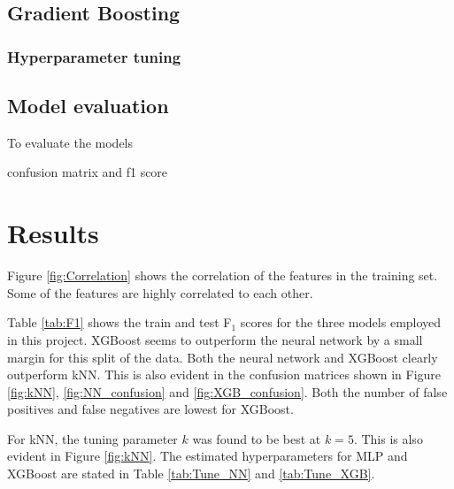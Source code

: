 \documentclass[a4paper, 11pt, twocolumn]{article}
\begin{document}
\subsection{Gradient Boosting}
\subsubsection{Hyperparameter tuning}


\subsection{Model evaluation}
To evaluate the models 

confusion matrix and f1 score

\section{Results}

Figure \ref{fig:Correlation} shows the correlation of the features in the training set. Some of the features are highly correlated to each other.

Table \ref{tab:F1} shows the train and test F$_1$ 
scores for the three models employed in this project. 
XGBoost seems to outperform the neural network by a
 small margin for this split of the data. Both the
  neural network and XGBoost clearly outperform kNN.
  This is also evident in the confusion matrices shown
  in Figure \ref{fig:kNN}, \ref{fig:NN_confusion} and
  \ref{fig:XGB_confusion}. Both the number of false
  positives and false negatives are lowest for XGBoost.
  
For kNN, the tuning parameter $k$ was found to be best
at $k=5$. This is also evident in Figure
\ref{fig:kNN}. The estimated hyperparameters for MLP and
  XGBoost are stated in Table \ref{tab:Tune_NN} and
   \ref{tab:Tune_XGB}.

\begin{table}
\centering
{}
\caption{Estimated hyperparameters for the neural network model employed in this project.}
\label{tab:Tune_NN}
\end{table}

\begin{table}
\centering
{}
\caption{Estimated hyperparameters for the XGB model employed in this project.}
\label{tab:Tune_XGB}
\end{table}
\end{document}
